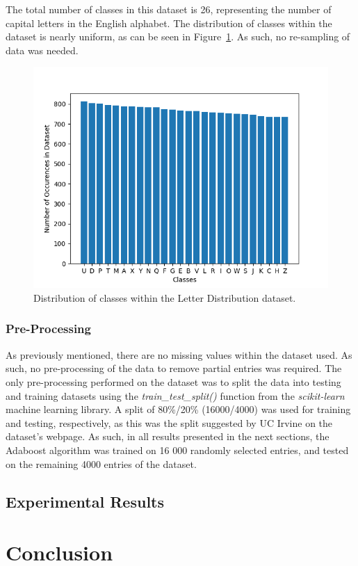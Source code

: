 \documentclass[a4paper]{article}
\begin{document}
The total number of classes in this dataset is 26, representing the number of capital letters in the English alphabet. The distribution of classes within the dataset is nearly uniform, as can be seen in Figure~\ref{fig:class-histogram}. As such, no re-sampling of data was needed.

\begin{figure}[h]
    \centering
    \includegraphics[scale=0.7]{images/class-distribution.png}
    \caption{Distribution of classes within the Letter Distribution dataset.}
    \label{fig:class-histogram}
\end{figure}

\subsubsection{Pre-Processing}
As previously mentioned, there are no missing values within the dataset used. As such, no pre-processing of the data to remove partial entries was required. The only pre-processing performed on the dataset was to split the data into testing and training datasets using the \textit{train\_test\_split()} function from the \textit{scikit-learn} machine learning library. A split of 80\%/20\% (16000/4000) was used for training and testing, respectively, as this was the split suggested by UC Irvine on the dataset's webpage. As such, in all results presented in the next sections, the Adaboost algorithm was trained on 16 000 randomly selected entries, and tested on the remaining 4000 entries of the dataset.

\subsection{Experimental Results}

\section{Conclusion}

\newpage



\end{document}

